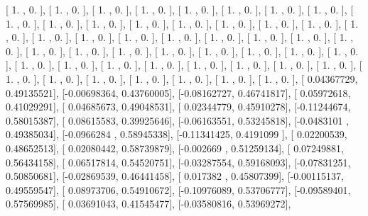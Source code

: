 \documentclass{article}
\begin{document}
       [ 1.        ,  0.        ],
       [ 1.        ,  0.        ],
       [ 1.        ,  0.        ],
       [ 1.        ,  0.        ],
       [ 1.        ,  0.        ],
       [ 1.        ,  0.        ],
       [ 1.        ,  0.        ],
       [ 1.        ,  0.        ],
       [ 1.        ,  0.        ],
       [ 1.        ,  0.        ],
       [ 1.        ,  0.        ],
       [ 1.        ,  0.        ],
       [ 1.        ,  0.        ],
       [ 1.        ,  0.        ],
       [ 1.        ,  0.        ],
       [ 1.        ,  0.        ],
       [ 1.        ,  0.        ],
       [ 1.        ,  0.        ],
       [ 1.        ,  0.        ],
       [ 1.        ,  0.        ],
       [ 1.        ,  0.        ],
       [ 1.        ,  0.        ],
       [ 1.        ,  0.        ],
       [ 1.        ,  0.        ],
       [ 1.        ,  0.        ],
       [ 1.        ,  0.        ],
       [ 1.        ,  0.        ],
       [ 1.        ,  0.        ],
       [ 1.        ,  0.        ],
       [ 1.        ,  0.        ],
       [ 1.        ,  0.        ],
       [ 1.        ,  0.        ],
       [ 1.        ,  0.        ],
       [ 1.        ,  0.        ],
       [ 1.        ,  0.        ],
       [ 1.        ,  0.        ],
       [ 1.        ,  0.        ],
       [ 1.        ,  0.        ],
       [ 1.        ,  0.        ],
       [ 1.        ,  0.        ],
       [ 1.        ,  0.        ],
       [ 1.        ,  0.        ],
       [ 1.        ,  0.        ],
       [ 1.        ,  0.        ],
       [ 1.        ,  0.        ],
       [ 1.        ,  0.        ],
       [ 1.        ,  0.        ],
       [ 1.        ,  0.        ],
       [ 0.04367729,  0.49135521],
       [-0.00698364,  0.43760005],
       [-0.08162727,  0.46741817],
       [ 0.05972618,  0.41029291],
       [ 0.04685673,  0.49048531],
       [ 0.02344779,  0.45910278],
       [-0.11244674,  0.58015387],
       [ 0.08615583,  0.39925646],
       [-0.06163551,  0.53245818],
       [-0.0483101 ,  0.49385034],
       [-0.0966284 ,  0.58945338],
       [-0.11341425,  0.4191099 ],
       [ 0.02200539,  0.48652513],
       [ 0.02080442,  0.58739879],
       [-0.002669  ,  0.51259134],
       [ 0.07249881,  0.56434158],
       [ 0.06517814,  0.54520751],
       [-0.03287554,  0.59168093],
       [-0.07831251,  0.50850681],
       [-0.02869539,  0.46441458],
       [ 0.017382  ,  0.45807399],
       [-0.00115137,  0.49559547],
       [ 0.08973706,  0.54910672],
       [-0.10976089,  0.53706777],
       [-0.09589401,  0.57569985],
       [ 0.03691043,  0.41545477],
       [-0.03580816,  0.53969272],
\end{document}
